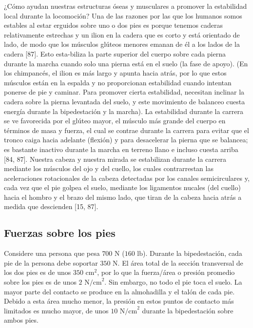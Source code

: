 \documentclass[12pt]{book}
\begin{document}
¿Cómo ayudan nuestras estructuras óseas y musculares a promover la estabilidad local durante la locomoción? Una de las razones por las que los humanos somos estables al estar erguidos sobre uno o dos pies es porque tenemos caderas relativamente estrechas y un ilion en la cadera que es corto y está orientado de lado, de modo que los músculos glúteos menores emanan de él a los lados de la cadera [87]. Esto esta-biliza la parte superior del cuerpo sobre cada pierna durante la marcha cuando solo una pierna está en el suelo (la fase de apoyo). (En los chimpancés, el ilion es más largo y apunta hacia atrás, por lo que estos músculos están en la espalda y no proporcionan estabilidad cuando intentan ponerse de pie y caminar. Para promover cierta estabilidad, necesitan inclinar la cadera sobre la pierna levantada del suelo, y este movimiento de balanceo cuesta energía durante la bipedestación y la marcha). La estabilidad durante la carrera se ve favorecida por el glúteo mayor, el músculo más grande del cuerpo en términos de masa y fuerza, el cual se contrae durante la carrera para evitar que el tronco caiga hacia adelante (flexión) y para desacelerar la pierna que se balancea; es bastante inactivo durante la marcha en terreno llano e incluso cuesta arriba [84, 87]. Nuestra cabeza y nuestra mirada se estabilizan durante la carrera mediante los músculos del ojo y del cuello, los cuales contrarrestan las aceleraciones rotacionales de la cabeza detectadas por los canales semicirculares y, cada vez que el pie golpea el suelo, mediante los ligamentos nucales (del cuello) hacia el hombro y el brazo del mismo lado, que tiran de la cabeza hacia atrás a medida que descienden [15, 87].

\subsection{Fuerzas sobre los pies}

Considere una persona que pesa $700\text{ N}$ ($160\text{ lb}$). Durante la bipedestación, cada pie de la persona debe soportar $350\text{ N}$. El área total de la sección transversal de los dos pies es de unos $350\text{ cm}^2$, por lo que la fuerza/área o presión promedio sobre los pies es de unos $2\text{ N/cm}^2$. Sin embargo, no todo el pie toca el suelo. La mayor parte del contacto se produce en la almohadilla y el talón de cada pie. Debido a esta área mucho menor, la presión en estos puntos de contacto más limitados es mucho mayor, de unos $10\text{ N/cm}^2$ durante la bipedestación sobre ambos pies.
\end{document}
